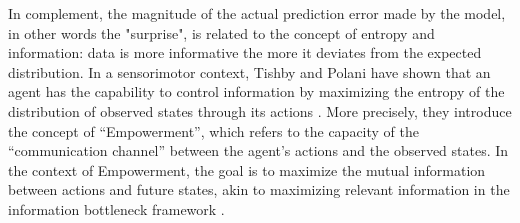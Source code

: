\documentclass[10pt,letterpaper]{article}
\begin{document}
\begin{itemize}


In complement, the magnitude of the actual prediction error made by the model, in other words the "surprise", is related to the concept of entropy and information: data is more informative the more it deviates from the expected distribution. In a sensorimotor context, Tishby and Polani have shown that an agent has the capability to control information by maximizing the entropy of the distribution of observed states through its actions \cite{Klyubin2005EmpowermentAU}. More precisely, they introduce the concept of ``Empowerment'', which refers to the capacity of the ``communication channel'' between the agent's actions and the observed states.
In the context of Empowerment, the goal is to maximize the mutual information between actions and future states, akin to maximizing relevant information in the information bottleneck framework \cite{tishby2000information}.
\end{itemize}
\end{document}
